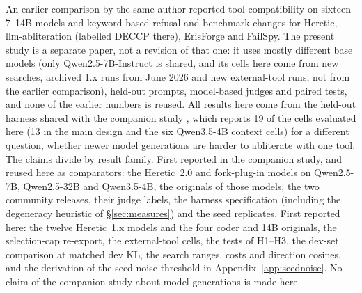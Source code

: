 An earlier comparison by the same author \cite{young2025comparative} reported tool compatibility on sixteen 7--14B
models and keyword-based refusal and benchmark changes for Heretic, llm-abliteration (labelled DECCP there), ErisForge and FailSpy.
The present study is a separate paper, not a revision of that one: it uses mostly different base models (only
Qwen2.5-7B-Instruct is shared, and its cells here come from new searches, archived 1.x runs from June 2026 and new
external-tool runs, not from the earlier comparison), held-out prompts, model-based judges and paired tests, and none
of the earlier numbers is reused. All results here come from the held-out harness shared with the companion study
\cite{young2026harder}, which reports 19 of the cells evaluated here (13 in the main design and the six Qwen3.5-4B
context cells) for a different question, whether newer model generations are harder to abliterate with one tool. The
claims divide by result family. First reported in the companion study, and reused here as comparators: the Heretic~2.0
and fork-plug-in models on Qwen2.5-7B, Qwen2.5-32B and Qwen3.5-4B, the originals of those models, the two community
releases, their judge labels, the harness specification (including the degeneracy heuristic of
\S\ref{sec:measures}) and the seed replicates. First reported here: the twelve Heretic~1.x models and the four
coder and 14B originals, the selection-cap re-export, the external-tool cells, the tests of H1--H3, the dev-set
comparison at matched dev KL, the search ranges, costs and direction cosines, and the derivation of the seed-noise
threshold in Appendix~\ref{app:seednoise}. No claim of the companion study about model generations is made here.
